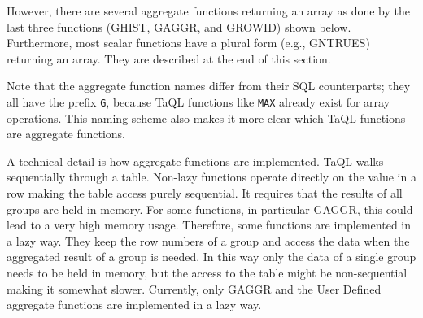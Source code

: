 However, there are several aggregate functions returning an array as
done by the last three functions (GHIST, GAGGR, and GROWID) shown below.
Furthermore, most scalar functions have a plural form (e.g., GNTRUES) returning an
array. They are described at the end of this section.

Note that the aggregate function names differ from their SQL counterparts;
they all have the prefix \texttt{G}, because TaQL functions like
\texttt{MAX} already exist for array operations. This naming scheme
also makes it more clear which TaQL functions are aggregate functions.

A technical detail is how aggregate functions are
implemented. TaQL walks sequentially through a table. Non-lazy
functions operate directly on the value in a row making the table
access purely sequential. It requires that the results of all groups
are held in memory. For some functions, in particular GAGGR, this
could lead to a very high memory usage. Therefore, some functions are
implemented in a lazy way. They 
keep the row numbers of a group and access the data when the
aggregated result of a group is needed. In this way only the data of a
single group needs to be held in memory, but the access to the table
might be non-sequential making it somewhat slower.
Currently, only GAGGR and the User Defined aggregate functions are
implemented in a lazy way. 

